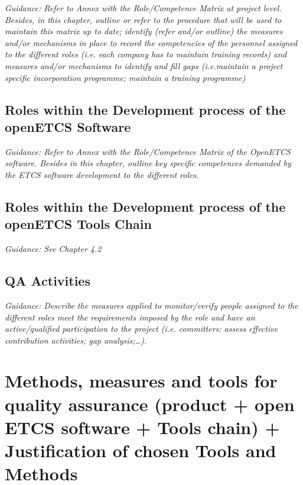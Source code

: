 \documentclass{template/openetcs_article}
\begin{document}
\textit{Guidance: Refer to Annex with the Role/Competence Matrix at project level.
Besides, in this chapter,  outline or refer to the procedure that will be used to maintain this matrix up to date; identify (refer and/or outline) the measures and/or mechanisms in place to record the competencies of the personnel assigned to the different roles (i.e. each company has to maintain training records) and measures and/or mechanisms to identify and fill gaps (i.e.maintain a project specific incorporation programme; maintain a training programme)}

\subsection{Roles within the Development process of the openETCS Software}
\textit{Guidance: Refer to Annex with the Role/Competence Matrix of the OpenETCS software. 
Besides in this chapter, outline key specific competences demanded by the ETCS software development to the different roles.}

\subsection{Roles within the Development process of the openETCS Tools Chain}
\textit{Guidance: See Chapter 4.2}

\subsection{QA Activities}

\textit{Guidance: Describe the measures applied to monitor/verify people assigned to the different roles meet the requirements imposed by the role and have an active/qualified participation to the project (i.e. committers: assess effective contribution activities; gap analysis;{\dots}).}

\section{Methods, measures and tools for quality assurance (product + open ETCS software + Tools chain) + Justification of chosen Tools and Methods}


\end{document}
